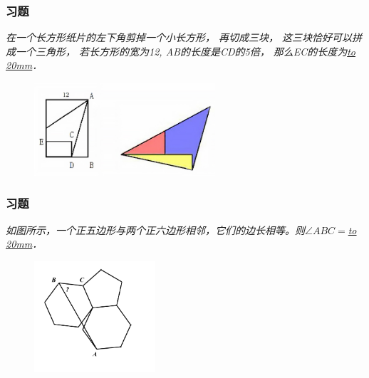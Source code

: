 \begin{frame}
    \frametitle{习题\theframecounter}
    \vspace*{-1cm}
    \textit{在一个长方形纸片的左下角剪掉一个小长方形，
    再切成三块， 这三块恰好可以拼成一个三角形，
    若长方形的宽为12, AB的长度是CD的5倍，
    那么EC的长度为\underline{\hbox to 20mm{}}．} 
    \begin{figure}[H] 
        \centering
        \includegraphics[width=0.6\textwidth]{./pics/Chapter_3/6.png}
    \end{figure}
\end{frame}

\begin{frame}
    \frametitle{习题\theframecounter}
    \vspace*{-1cm}
    \textit{如图所示，一个正五边形与两个正六边形相邻，它们的边长相等。则$\angle ABC = $\underline{\hbox to 20mm{}}．} 
    \begin{figure}[H] 
        \centering
        \includegraphics[width=0.4\textwidth]{./pics/Chapter_3/7.png}
    \end{figure}
\end{frame}

